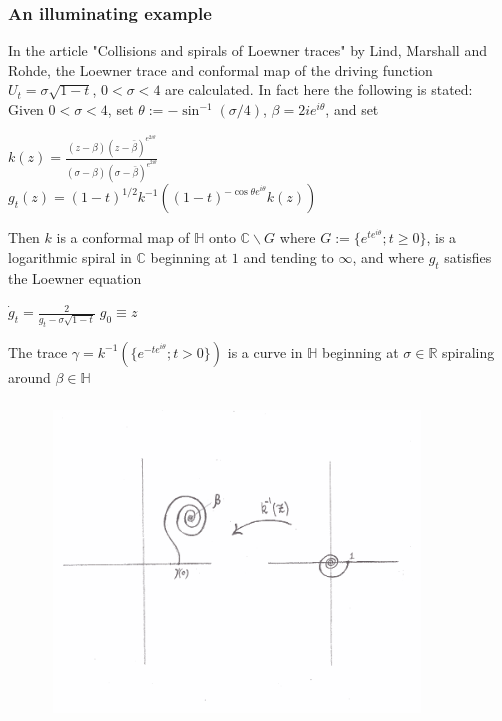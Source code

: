 \documentclass[10pt, compress]{beamer}
\begin{document}
\begin{frame}[fragile]
  \frametitle{An illuminating example}
  \small
In the article "Collisions and spirals of Loewner traces" by Lind, Marshall and Rohde, the Loewner trace and conformal map of the driving function $U_{t} = \sigma\sqrt{1-t}$, $0 < \sigma < 4$ are calculated. In fact here the following is stated:\\

Given $0 < \sigma < 4$, set $\theta := -\sin^{-1}(\sigma/4)$, $\beta = 2ie^{i\theta}$, and set

\begin{center}
$k(z) = \frac{(z-\beta)(z-\bar{\beta})^{e^{2i\theta}}}{(\sigma - \beta)(\sigma - \bar{\beta})^{e^{2i\theta}}}$ \\
$g_{t}(z) = (1-t)^{1/2}k^{-1}((1-t)^{-\cos\theta e^{i\theta}}k(z))$ 
\end{center}

Then $k$ is a conformal map of $\mathbb{H}$ onto $\mathbb{C}\backslash G$ where $ G := \{e^{te^{i\theta}} ; t \geq 0 \}$, is a logarithmic spiral in $\mathbb{C}$ beginning at $1$ and tending to $\infty$, and where $g_{t}$ satisfies the Loewner equation 
\begin{center}
$\displaystyle{\dot g_{t} = \frac{2}{g_{t} - \sigma\sqrt{1-t}} \; g_{0} \equiv z} $
\end{center}
The trace $\gamma = k^{-1}(\{e^{-te^{i\theta}} ; t > 0\})$ is a curve in $\mathbb{H}$ beginning at $\sigma \in \mathbb{R}$ spiraling around $\beta \in \mathbb{H}$

\normalsize
\end{frame}

\begin{frame}[fragile]
  \frametitle{}
\begin{figure}
 \includegraphics[width=10cm,height=8cm]{spiral.png}
\end{figure}
\end{frame}
\end{document}
